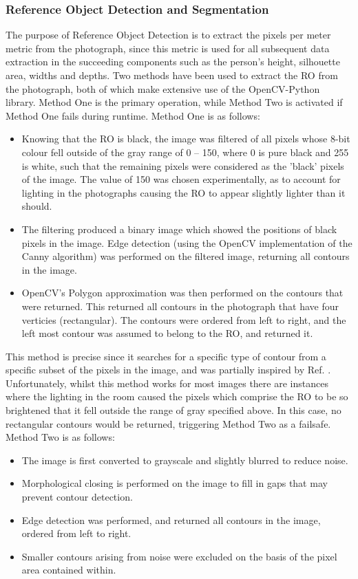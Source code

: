 \documentclass[conference]{IEEEtran}
\begin{document}
\subsubsection{Reference Object Detection and Segmentation} \label{refobdetseg}
The purpose of Reference Object Detection is to extract the pixels per meter metric from the photograph, since this metric is used for all subsequent data extraction in the succeeding components such as the person's height, silhouette area, widths and depths.
Two methods have been used to extract the RO from the photograph, both of which make extensive use of the OpenCV-Python library.
Method One is the primary operation, while Method Two is activated if Method One fails during runtime.
Method One is as follows:
\begin{itemize}
	\item Knowing that the RO is black, the image was filtered of all pixels whose 8-bit colour fell outside of the gray range of 0 -- 150, where 0 is pure black and 255 is white, such that the remaining pixels were considered as the 'black' pixels of the image.
	The value of 150 was chosen experimentally, as to account for lighting in the photographs causing the RO to appear slightly lighter than it should.
	\item The filtering produced a binary image which showed the positions of black pixels in the image.
	Edge detection (using the OpenCV implementation of the Canny algorithm) was performed on the filtered image, returning all contours in the image.
	\item OpenCV's Polygon approximation was then performed on the contours that were returned.
	This returned all contours in the photograph that have four verticies (rectangular).
	The contours were ordered from left to right, and the left most contour was assumed to belong to the RO, and returned it.
\end{itemize}
This method is precise since it searches for a specific type of contour from a specific subset of the pixels in the image, and was partially inspired by Ref. \cite{blackShapeDetection}.
Unfortunately, whilst this method works for most images there are instances where the lighting in the room caused the pixels which comprise the RO to be so brightened that it fell outside the range of gray specified above.
In this case, no rectangular contours would be returned, triggering Method Two as a failsafe. 
Method Two is as follows:
\begin{itemize}
	\item The image is first converted to grayscale and slightly blurred to reduce noise.
	\item Morphological closing is performed on the image to fill in gaps that may prevent contour detection.
	\item Edge detection was performed, and returned all contours in the image, ordered from left to right.
	\item Smaller contours arising from noise were excluded on the basis of the pixel area contained within.
\end{itemize}
\end{document}
